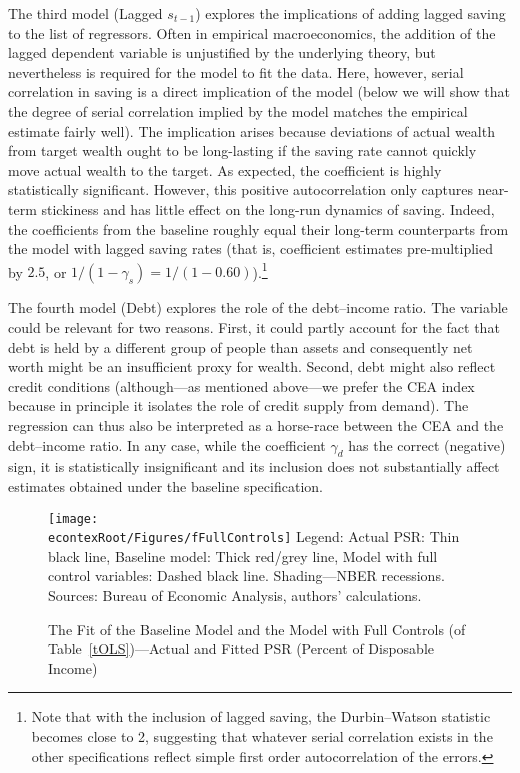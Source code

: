 \documentclass[titlepage]{\econtex}
\begin{document}
The third model (Lagged $s_{t-1}$) explores the implications of adding lagged saving to the list of regressors.  Often in empirical
macroeconomics, the addition of the lagged dependent variable is unjustified by the underlying theory, but nevertheless is required
for the model to fit the data.  Here, however, serial correlation in saving is a direct implication of the model (below we will show that the degree of serial correlation implied by the model matches the empirical estimate fairly well).  The implication arises because deviations of actual wealth from target wealth ought to be long-lasting if the saving rate cannot quickly move actual wealth to the target.  As expected, the coefficient is highly statistically significant.  However, this positive autocorrelation only captures near-term stickiness and has little effect on the long-run dynamics of saving. Indeed, the coefficients from the baseline roughly equal their long-term counterparts from the model with lagged saving rates (that is, coefficient estimates pre-multiplied by $2.5$, or $1/(1-\gamma_s)=1/(1-0.60)$).\footnote{Note that with the inclusion
  of lagged saving, the Durbin--Watson statistic becomes close to 2,
  suggesting that whatever serial correlation exists in the
  other specifications reflect simple first order autocorrelation of
  the errors.}

The fourth model (Debt) explores the role of the debt--income ratio. The variable could be relevant for two reasons. First, it could partly account for the fact that debt is held by a different group of people than assets and consequently net worth might be an insufficient proxy for wealth. Second, debt might also reflect credit conditions (although---as mentioned above---we prefer the CEA index because in principle it isolates the role of credit supply from demand). The regression can thus also be interpreted as a horse-race between the CEA and the debt--income ratio. In any case, while the coefficient $\gamma_d$ has the correct (negative) sign, it is statistically insignificant and its inclusion does not substantially affect estimates obtained under the baseline specification.


\begin{figure}
\caption{The Fit of the Baseline Model and the Model with Full Controls (of Table~\ref{tOLS})---Actual and Fitted PSR (Percent of Disposable Income)}
\label{fFullControls}
\texttt{[image: \\econtexRoot/Figures/fFullControls]}
\footnotesize
Legend: Actual PSR: Thin black line, Baseline model: Thick red/grey line, Model with full control variables: Dashed black line. Shading---NBER recessions.\\[0mm]
\tiny Sources: Bureau of Economic Analysis, authors' calculations.
\end{figure}
\end{document}
